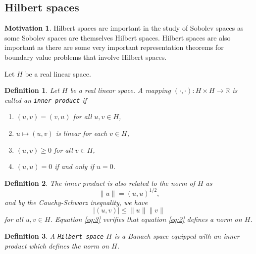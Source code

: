 \documentclass[11pt]{article}
\newtheorem{definition}{Definition}
\theoremstyle{definition}
\newtheorem*{motivation}{Motivation}
\begin{document}
\subsection{Hilbert spaces}
\begin{motivation}
	Hilbert spaces are important in the study of Sobolev spaces as some Sobolev spaces are themselves Hilbert spaces.
	Hilbert spaces are also important as there are some very important representation theorems for boundary value problems that involve Hilbert spaces.
\end{motivation}
Let $H$ be a real linear space.
\begin{definition}
	Let $H$ be a real linear space. A mapping $(\cdot , \cdot) : H \times H \rightarrow \mathbb{R}$ is called an \texttt{inner product} if
	\begin{enumerate}
		\item $(u,v) = (v,u)$ for all $u,v \in H$,
		\item $u \mapsto (u,v)$ is linear for each $v \in H$,
		\item $(u,v) \geq 0$ for all $v \in H$,
		\item $(u,u) = 0$ if and only if $u = 0$.
	\end{enumerate}
\end{definition}
\begin{definition}
	The inner product is also related to the norm of $H$ as
	\begin{equation}
		\label{eq:2}
		\|u\| = (u,u)^{1/2},
	\end{equation}
	and by the Cauchy-Schwarz inequality, we have
	\begin{equation}
		\label{eq:3}
		|(u,v)| \leq \|u\|\|v\|
	\end{equation}
	for all $u,v \in H$. Equation \ref{eq:3} verifies that equation \ref{eq:2} defines a norm on $H$. 
\end{definition}
\begin{definition}
	A \texttt{Hilbert space} $H$ is a Banach space equipped with an inner product which defines the norm on $H$.
\end{definition}
\end{document}
